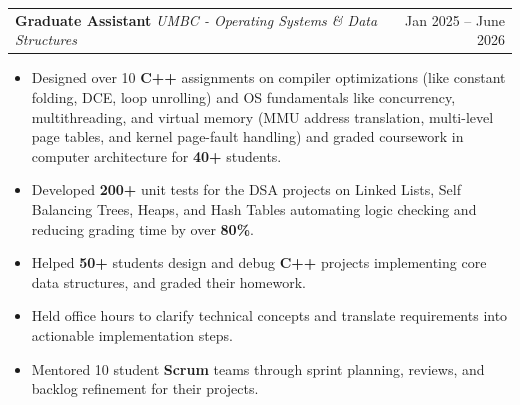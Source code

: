 \documentclass[letterpaper,11pt]{article}
\makeatletter
\newcommand{\BulletItems}[1]{
  \item
    \begin{itemize}[label={-}, leftmargin=*, labelsep=0.3em, topsep=0pt, partopsep=0pt, itemsep=0pt, parsep=0pt]
      \small #1
    \end{itemize}\vspace{-5pt}
}
\newcommand{\SLSubheadingItemThF}[3]{
  \vspace{-2pt}\item
    \begin{tabular*}{0.97\textwidth}[t]{l@{\extracolsep{\fill}}r}
      \textbf{#1} \textbar{} \textit{\small #2} & {\small #3} \\
    \end{tabular*}\vspace{-7pt}
}
\makeatother
\begin{document}
    \SLSubheadingItemThF
      {Graduate Assistant}
      {UMBC - Operating Systems \& Data Structures}
      {Jan 2025 -- June 2026}
    \BulletItems{
      \item Designed over 10 \textbf{C++} assignments on compiler optimizations (like constant folding, DCE, loop unrolling) and OS fundamentals like concurrency, multithreading, and virtual memory (MMU address translation, multi-level page tables, and kernel page-fault handling) and graded coursework in computer architecture for \textbf{40+} students.
      \item Developed \textbf{200+} unit tests for the DSA projects on Linked Lists, Self Balancing Trees, Heaps, and Hash Tables automating logic checking and reducing grading time by over \textbf{80\%}.
      \item Helped \textbf{50+} students design and debug \textbf{C++} projects implementing core data structures, and graded their homework.
      \item Held office hours to clarify technical concepts and translate requirements into actionable implementation steps.
      \item Mentored 10 student \textbf{Scrum} teams through sprint planning, reviews, and backlog refinement for their projects.
     }
\end{document}
